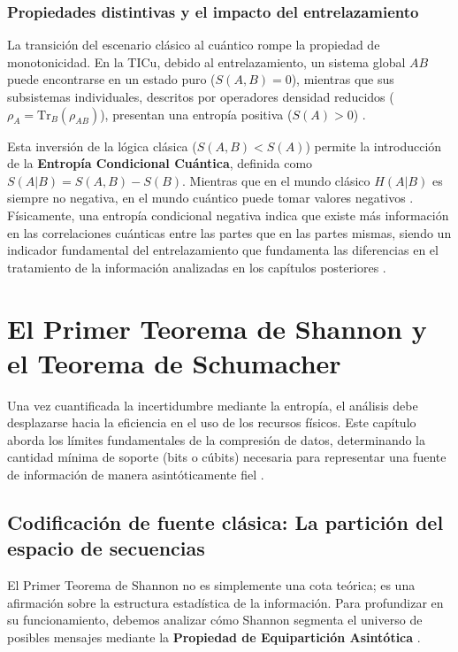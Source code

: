 \documentclass[11pt,a4paper,spanish]{book}
\begin{document}
\subsubsection{Propiedades distintivas y el impacto del entrelazamiento}

La transición del escenario clásico al cuántico rompe la propiedad de monotonicidad. En la TICu, debido al entrelazamiento, un sistema global $AB$ puede encontrarse en un estado puro ($S(A,B) = 0$), mientras que sus subsistemas individuales, descritos por operadores densidad reducidos ($\rho_A = \text{Tr}_B(\rho_{AB})$), presentan una entropía positiva ($S(A) > 0$) \citep{nielsen2010}.

Esta inversión de la lógica clásica ($S(A,B) < S(A)$) permite la introducción de la \textbf{Entropía Condicional Cuántica}, definida como $S(A|B) = S(A,B) - S(B)$. Mientras que en el mundo clásico $H(A|B)$ es siempre no negativa, en el mundo cuántico puede tomar valores negativos \citep{cerf1997}. Físicamente, una entropía condicional negativa indica que existe más información en las correlaciones cuánticas entre las partes que en las partes mismas, siendo un indicador fundamental del entrelazamiento que fundamenta las diferencias en el tratamiento de la información analizadas en los capítulos posteriores \citep{schumacher1995}.

\section{El Primer Teorema de Shannon y el Teorema de Schumacher}

Una vez cuantificada la incertidumbre mediante la entropía, el análisis debe desplazarse hacia la eficiencia en el uso de los recursos físicos. Este capítulo aborda los límites fundamentales de la compresión de datos, determinando la cantidad mínima de soporte (bits o cúbits) necesaria para representar una fuente de información de manera asintóticamente fiel \citep{shannon1948, schumacher1995}.

\subsection{Codificación de fuente clásica: La partición del espacio de secuencias}

El Primer Teorema de Shannon no es simplemente una cota teórica; es una afirmación sobre la estructura estadística de la información. Para profundizar en su funcionamiento, debemos analizar cómo Shannon segmenta el universo de posibles mensajes mediante la \textbf{Propiedad de Equipartición Asintótica} \citep{shannon1948, nielsen2010}.
\end{document}
